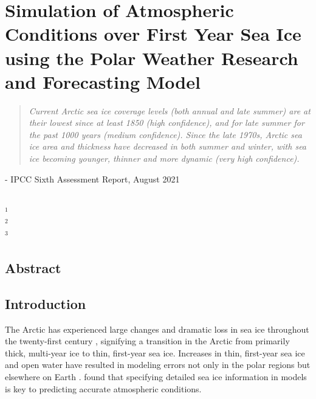 \chapter{Simulation of Atmospheric Conditions over First Year Sea Ice using the Polar Weather Research and Forecasting Model}
\vspace{1 cm}
\begin{spacing}{1} \begin{quote} 
\noindent \emph{Current Arctic sea ice coverage levels (both annual and late summer) are at their lowest since at least 1850 (high confidence), and for late summer for the past 1000 years (medium confidence). Since the late 1970s, Arctic sea ice area and thickness have decreased in both summer and winter, with sea ice becoming younger, thinner and more dynamic (very high confidence).}\end{quote}
\hspace{6 cm} - IPCC Sixth Assessment Report, August 2021  
\end{spacing}
\vspace{1 cm}
\noindent 
\vspace{1 cm}\\
\noindent $^1$\\
$^2$\\
$^3$\\


\section*{Abstract}

\begin{spacing}{1} \noindent 
\end{spacing}

\doublespacing
\section{Introduction}

The Arctic has experienced large changes and dramatic loss in sea ice throughout the twenty-first century \citep{hines:2015}, signifying a transition in the Arctic from primarily thick, multi-year ice to thin, first-year sea ice. Increases in thin, first-year sea ice and open water have resulted in modeling errors not only in the polar regions but elsewhere on Earth \citep{hines:2015, royer:1990, francis:2009}. \citet{rinke:2006} found that specifying detailed sea ice information in models is key to predicting accurate atmospheric conditions. 

